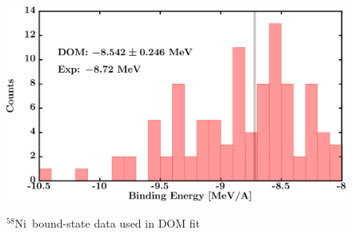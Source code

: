 \documentclass[twocolumn,secnumarabic,amssymb, nobibnotes, aps, prl,
superscriptaddress, nobalancelastpage, draft]{revtex4}
\newcommand{\niEight}{\ensuremath{^{58}}N\lowercase{i}}
\begin{document}
\begin{figure}[!htb]
\begin{minipage}{0.4\linewidth}
        \label{DOM_ni58_RMSRadius}
    \end{minipage}
    \begin{minipage}{0.4\linewidth}
        \centering
        \includegraphics[width=\linewidth]{figures/ni58_BE.png}
        \label{DOM_ni58_BE}
    \end{minipage}
    \caption{\niEight\ bound-state data used in DOM fit}
    \label{DOM_ni58_structural}
\end{figure}
\end{document}
